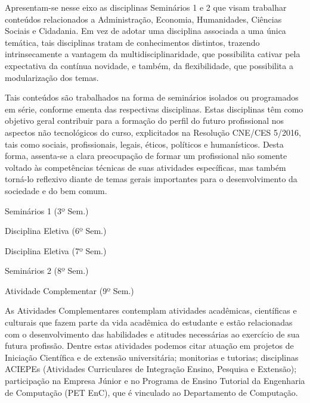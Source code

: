 Apresentam-se nesse eixo as disciplinas Seminários 1 e 2 que visam trabalhar conteúdos relacionados a Administração, Economia, Humanidades, Ciências Sociais e Cidadania. Em vez de adotar uma disciplina associada a uma única temática, tais disciplinas tratam de conhecimentos distintos, trazendo intrinsecamente a vantagem da multidisciplinaridade, que possibilita cativar pela expectativa da contínua novidade, e também, da flexibilidade, que possibilita a modularização dos temas.

Tais conteúdos são trabalhados na forma de seminários isolados ou programados em série, conforme ementa das respectivas disciplinas. Estas disciplinas têm como objetivo geral contribuir para a formação do perfil do futuro profissional nos aspectos não tecnológicos do curso, explicitados na Resolução CNE/CES 5/2016, tais como sociais, profissionais, legais, éticos, políticos e humanísticos. Desta forma, assenta-se a clara preocupação de formar um profissional não somente voltado às competências técnicas de suas atividades específicas, mas também torná-lo reflexivo diante de temas gerais importantes para o desenvolvimento da sociedade e do bem comum.

\begin{compenum}
    \item Seminários 1 (3º Sem.)
    \item Disciplina Eletiva (6º Sem.)
    \item Disciplina Eletiva (7º Sem.)
    \item Seminários 2 (8º Sem.)
    \item Atividade Complementar (9º Sem.)
\end{compenum}

As Atividades Complementares contemplam atividades acadêmicas, científicas e culturais que fazem parte da vida acadêmica do estudante e estão relacionadas com o desenvolvimento das habilidades e atitudes necessárias ao exercício de sua futura profissão. Dentre estas atividades podemos citar atuação em projetos de Iniciação Científica e de extensão universitária; monitorias e tutorias; disciplinas ACIEPEs (Atividades Curriculares de Integração Ensino, Pesquisa e Extensão); participação na Empresa Júnior e no Programa de Ensino Tutorial da Engenharia de Computação (PET EnC), que é vinculado ao Departamento de Computação. %

